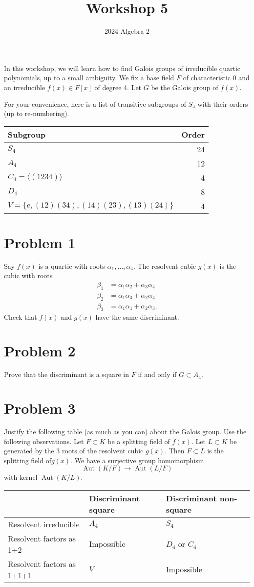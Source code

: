 \documentclass[12pt]{amsart}
\author{2024 Algebra 2}
\date{}
\title{Workshop 5}
\begin{document}
\maketitle
In this workshop, we will learn how to find Galois groups of irreducible quartic polynomials, up to a small ambiguity.
We fix a base field \(F\) of characteristic 0 and an irreducible \(f(x) \in F[x]\) of degree 4.
Let \(G\) be the Galois group of \(f(x)\).

For your convenience, here is a list of transitive subgroups of \(S_{4}\) with their orders (up to re-numbering).

\begin{center}
\begin{tabular}{lr}
Subgroup & Order\\
\hline
\(S_4\) & 24\\
\(A_4\) & 12\\
\(C_4 = \langle (1234) \rangle\) & 4\\
\(D_4\) & 8\\
\(V = \{e,(12)(34), (14)(23), (13)(24) \}\) & 4\\
\hline
\end{tabular}
\end{center}
\section{Problem 1}
\label{sec:org1b6aedd}

Say \(f(x)\) is a quartic with roots \(\alpha_1, \dots, \alpha_4\).
The resolvent cubic \(g(x)\) is the cubic with roots 
\begin{align*}
\beta_1 &= \alpha_1\alpha_2 + \alpha_3\alpha_4\\
\beta_2 &= \alpha_1\alpha_3 + \alpha_2\alpha_4\\
\beta_3 &= \alpha_1\alpha_4 + \alpha_2\alpha_3.
\end{align*}
Check that \(f(x)\) and \(g(x)\) have the same discriminant.
\section{Problem 2}
\label{sec:orgdb45c0e}

Prove that the discriminant is a square in \(F\) if and only if \(G \subset A_4\).
\section{Problem 3}
\label{sec:orgfec877a}

Justify the following table (as much as you can) about the Galois group.
Use the following observations.
Let \(F \subset K\) be a splitting field of \(f(x)\).
Let \(L \subset K\) be generated by the 3 roots of the resolvent cubic \(g(x)\).
Then \(F \subset L\) is the splitting field of\(g(x)\).
We have a surjective group homomorphism
\[ \operatorname{Aut}(K/F) \to \operatorname{Aut}(L/F)\]
with kernel \(\operatorname{Aut}(K/L)\).


\begin{center}
\begin{tabular}{lll}
 & Discriminant square & Discriminant non-square\\
\hline
Resolvent irreducible & \(A_4\) & \(S_4\)\\
Resolvent factors as 1+2 & Impossible & \(D_4\) or \(C_4\)\\
Resolvent factors as 1+1+1 & \(V\) & Impossible\\
\hline
\end{tabular}
\end{center}
\end{document}
